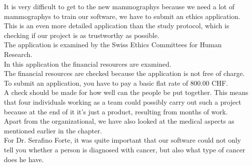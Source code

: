 It is very difficult to get to the new mammographys because we need a lot of mammographys to train our software, we have to submit an ethics application. \\
This is an even more detailed application than the study protocol, which is checking if our project is as trustworthy as possible. \\
The application is examined by the Swiss Ethics Committees for Human Research. \\
In this application the financial resources are examined. \\
The financial resources are checked because the application is not free of charge. \\
To submit an application, you have to pay a basic flat rate of 800.00 CHF. \\
A check should be made for how well can the people be put together.
This means that four individuals working as a team could possibly carry out such a project because at the end of it it's just a product, resulting from months of work. \\
Apart from the organizational, we have also looked at the medical aspects as mentioned earlier in the chapter. \\
For Dr. Serafino Forte, it was quite important that our software could not only tell you whether a person is diagnosed with cancer, but also what type of cancer does he have. \\
